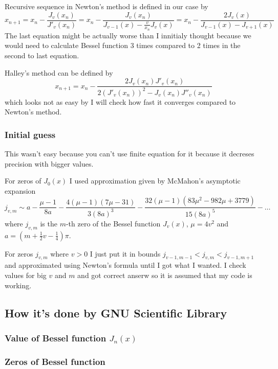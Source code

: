 \documentclass[a4paper]{article}
\begin{document}
	Recursive sequence in Newton's method is defined in our case by
	\begin{equation*}
		x_{n+1} = x_n - \frac{J_v(x_n)}{J'_v(x_n)} = 
			x_n - \frac{J_v(x_n)}{J_{v-1}(x) - \frac{v}{x_n}J_v(x)} =
			x_n - \frac{2J_v(x)}{J_{v-1}(x) - J_{v+1}(x)}
	\end{equation*}
	The last equation might be actually worse than I innitialy thought
	because we would need to calculate Bessel function 3 times compared to 2 times
	in the second to last equation.

	Halley's method can be defined by
	\begin{equation*}
		x_{n+1} = x_n - \frac{2J_v(x_n)J'_v(x_n)}{2(J'_v(x_n))^2 - J_v(x_n)J''_v(x_n)}
	\end{equation*}
	which looks not as easy by I will check how fast it converges compared to
	Newton's method.
	\subsubsection{Initial guess}
	This wasn't easy because you can't use finite equation for 
	it because it decreses precision with bigger values.

	For zeros of $J_0(x)$ I used approximation given by McMahon's
	asymptotic expansion \cite[equation 10.21.19]{NIST:DLMF}	
	\begin{equation}
		j_{v,m} \sim a - \frac{\mu - 1}{8a} - \frac{4(\mu -1)(7\mu-31)}{3(8a)^3}
			- \frac{32(\mu-1)(83\mu^2-982\mu+3779)}{15(8a)^5} - \dots
	\end{equation}
	where $j_{v,m}$ is the $m$-th zero of the Bessel function $J_v(x)$,
	$\mu=4v^2$ and $a=(m+\frac{1}{2}v-\frac{1}{4})\pi$.
	
	For zeros $j_{v,m}$ where $v > 0$ I just put it in bounds $j_{v-1,m-1} < j_{v,m} < j_{v-1,m+1}$
	\cite[equation 10.21.2]{NIST:DLMF} and approximated using Newton's formula until I got what I wanted. I check values for
	big $v$ and $m$ and got correct anserw so it is assumed that my code is working.
	\subsection{How it's done by GNU Scientific Library}
	\subsubsection{Value of Bessel function $J_n(x)$}
	\subsubsection{Zeros of Bessel function}
\end{document}
